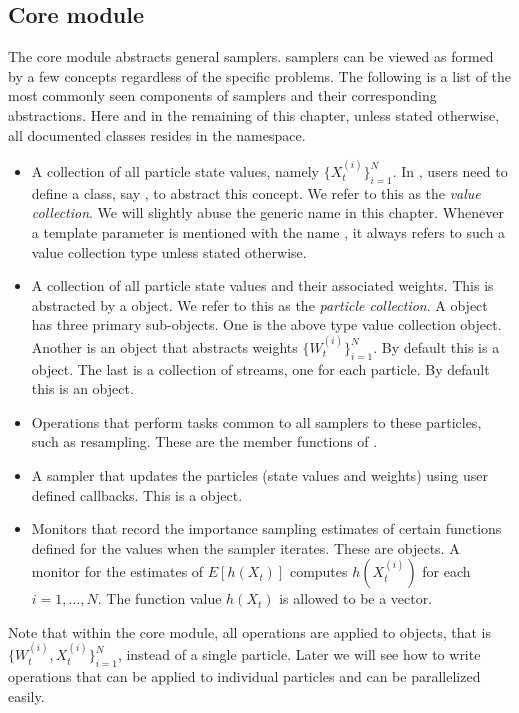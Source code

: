 \subsection{Core module}
\label{sub:Core module}

The core module abstracts general \smc samplers. \smc samplers can be viewed
as formed by a few concepts regardless of the specific problems. The following
is a list of the most commonly seen components of \smc samplers and their
corresponding \vsmc abstractions. Here and in the remaining of this chapter,
unless stated otherwise, all documented classes resides in the
 namespace.
\begin{itemize}
  \item A collection of all particle state values, namely
    $\{X_t^{(i)}\}_{i=1}^N$. In \vsmc, users need to define a class, say
    , to abstract this concept. We refer to this as the
    \emph{value collection}. We will slightly abuse the generic name
     in this chapter. Whenever a template parameter is mentioned
    with the name , it always refers to such a value collection
    type unless stated otherwise.
  \item A collection of all particle state values and their associated
    weights. This is abstracted by a  object. We refer
    to this as the \emph{particle collection}. A 
    object has three primary sub-objects. One is the above type 
    value collection object. Another is an object that abstracts weights
    $\{W_t^{(i)}\}_{i=1}^N$. By default this is a 
    object. The last is a collection of \rng streams, one for each particle.
    By default this is an  object.
  \item Operations that perform tasks common to all samplers to these
    particles, such as resampling. These are the member functions of
    .
  \item A sampler that updates the particles (state values and weights) using
    user defined callbacks. This is a  object.
  \item Monitors that record the importance sampling estimates of certain
    functions defined for the values when the sampler iterates. These are
     objects. A monitor for the estimates of $E[h(X_t)]$
    computes $h(X_t^{(i)})$ for each $i = 1,\dots,N$. The function value
    $h(X_t)$ is allowed to be a vector.
\end{itemize}
Note that within the core module, all operations are applied to
 objects, that is $\{W_t^{(i)},X_t^{(i)}\}_{i=1}^N$,
instead of a single particle. Later we will see how to write operations that
can be applied to individual particles and can be parallelized easily.

